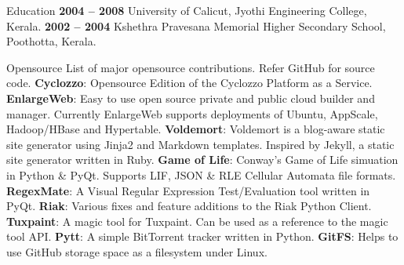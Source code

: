 \documentclass{resume}
\begin{document}



\begin{category}{Education}
   \hfill \textbf{2004 -- 2008}
  \citemnobullet University of Calicut, Jyothi Engineering College, Kerala.
   \hfill \textbf{2002 -- 2004}
  \citemnobullet Kshethra Pravesana Memorial Higher Secondary School, Poothotta, Kerala.
\end{category}


\begin{category}{Opensource}
  \citemnobullet List of major opensource contributions. Refer GitHub for source code.
  \citembullet \textbf{Cyclozzo}: Opensource Edition of the Cyclozzo Platform as a Service.
  \citembullet \textbf{EnlargeWeb}: Easy to use open source private and public cloud builder and manager. 
  Currently EnlargeWeb supports deployments of Ubuntu, AppScale, Hadoop/HBase and Hypertable.
  \citembullet \textbf{Voldemort}: Voldemort is a blog-aware static site generator using Jinja2 
  and Markdown templates. Inspired by Jekyll, a static site generator written in Ruby.
  \citembullet \textbf{Game of Life}: Conway's Game of Life simuation in Python \& PyQt. Supports LIF, JSON \&
  RLE Cellular Automata file formats.
  \citembullet \textbf{RegexMate}: A Visual Regular Expression Test/Evaluation tool written in PyQt.
  \citembullet \textbf{Riak}: Various fixes and feature additions to the Riak Python Client.
  \citembullet \textbf{Tuxpaint}: A magic tool for Tuxpaint. Can be used as a reference to the magic tool API.
  \citembullet \textbf{Pytt}: A simple BitTorrent tracker written in Python.
  \citembullet \textbf{GitFS}: Helps to use GitHub storage space as a filesystem under Linux.
\end{category}

\end{document}
